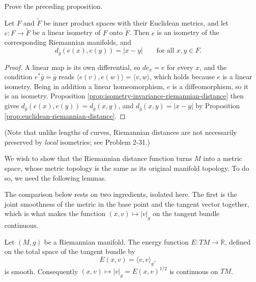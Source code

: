 \begin{exercise}
\label{exer:prove-isometry-invariance}
\leanok
{}

Prove the preceding proposition.
\end{exercise}

\begin{proposition}
\label{prop:euclidean-linear-isometry-distance}
\leanok
{}
Let $F$ and $\tilde{F}$ be inner product spaces with their Euclidean metrics, and let $e : F \to \tilde{F}$ be a linear isometry of $F$ onto $\tilde{F}$. Then $e$ is an isometry of the corresponding Riemannian manifolds, and
\[
  d_{\bar{g}}(e(x), e(y)) = |x - y| \qquad \text{for all } x, y \in F.
\]
\end{proposition}

\begin{proof}
\leanok
{}
A linear map is its own differential, so $de_x = e$ for every $x$, and the condition $e^* \bar{g} = \bar{g}$ reads $\langle e(v), e(w)\rangle = \langle v, w \rangle$, which holds because $e$ is a linear isometry. Being in addition a linear homeomorphism, $e$ is a diffeomorphism, so it is an isometry. Proposition \ref{prop:isometry-invariance-riemannian-distance} then gives $d_{\bar{g}}(e(x), e(y)) = d_{\bar{g}}(x,y)$, and $d_{\bar{g}}(x,y) = |x-y|$ by Proposition \ref{prop:euclidean-riemannian-distance}.
\end{proof}

(Note that unlike lengths of curves, Riemannian distances are not necessarily preserved by \textit{local} isometries; see Problem 2-31.)

We wish to show that the Riemannian distance function turns $M$ into a metric space, whose metric topology is the same as its original manifold topology. To do so, we need the following lemmas.

The comparison below rests on two ingredients, isolated here. The first is the joint
smoothness of the metric in the base point and the tangent vector together, which is what
makes the function $(x,v) \mapsto |v|_g$ on the tangent bundle continuous.

\begin{lemma}
\label{lem:metric-energy-smooth}
\leanok
{}
Let $(M,g)$ be a Riemannian manifold. The energy function $E : TM \to \mathbb{R}$, defined on
the total space of the tangent bundle by
\[
E(x,v) = \langle v, v \rangle_g,
\]
is smooth. Consequently $(x,v) \mapsto |v|_g = E(x,v)^{1/2}$ is continuous on $TM$.
\end{lemma}

